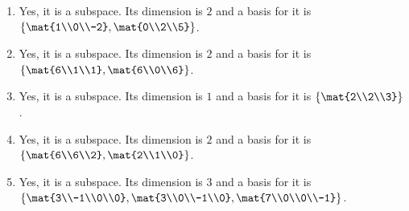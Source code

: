 \begin{exercises}
\begin{problist}
\begin{solution}
\begin{enumerate}
				\item Yes, it is a subspace. Its dimension is $2$ and a basis for it is $\left\{\mat{1\\0\\-2},\mat{0\\2\\5}\right\}$.

				\item Yes, it is a subspace. Its dimension is $2$ and a basis for it is $\left\{\mat{6\\1\\1},\mat{6\\0\\6}\right\}$.

				\item Yes, it is a subspace. Its dimension is $1$ and a basis for it is $\left\{\mat{2\\2\\3}\right\}$.

				\item Yes, it is a subspace. Its dimension is $2$ and a basis for it is $\left\{\mat{6\\6\\2},\mat{2\\1\\0}\right\}$.

				\item Yes, it is a subspace. Its dimension is $3$ and a basis for it is $\left\{\mat{3\\-1\\0\\0},\mat{3\\0\\-1\\0},\mat{7\\0\\0\\-1}\right\}$.
			\end{enumerate}
		\end{solution}


\end{problist}
\end{exercises}
